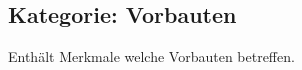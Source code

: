 \documentclass{article}
\newcommand{\mml}[1]{\texttt{#1}}
\newcommand{\merkmal}[2]{\subsubsection{\mml{#1}}\label{merkmal:#1}\index{\category! #1}\begin{description}#2\end{description}\medskip}
\newcommand{\erlaeuterung}[1]{\item[Erläuterung]:\\ #1 }
\newcommand{\wert}[1]{\item[Wert]:\\ #1 }
\newcommand{\beispiel}[1]{\item[Beispiele]:\\ #1 }
\newcommand{\rechtsmaterie}[1]{\item[Rechtsmaterie]:  \\#1 }
\newcommand{\notiz}[1]{\item[Bemerkungen]:  \\#1 }
\newcommand{\quelle}[1]{\inVersion{long}{\item[Quelle]: \\#1 }}
\newcommand{\frage}[1]{\inVersion{long}{\item[{\color{red}Frage}]: \\#1 }}
\newcommand{\etc}{{[\dots]}}
\newcommand{\category}{none}
\newcommand{\versionlength}{short}
\newcommand{\inVersion}[2]{\ifdefstring{\versionlength}{#1}{#2}{
\ifdefstring{\versionlength}{all}{\noindent \textbf{In #1 Version: }
  #2 \textbf{End of  #1 Version}\\}{}
}}
\begin{document}










\subsection{Kategorie: Vorbauten}
\label{sec:kategorie:vorbauten}

\renewcommand{\category}{Vorbauten}

Enthält Merkmale welche Vorbauten betreffen. \medskip
\end{document}
